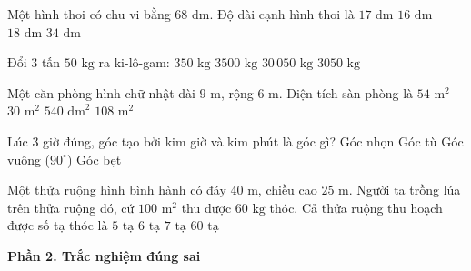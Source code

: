 \begin{ex} %
Một hình thoi có chu vi bằng $68\text{ dm}$. Độ dài cạnh hình thoi là
\choice
{\True $17\text{ dm}$}
{$16\text{ dm}$}
{$18\text{ dm}$}
{$34\text{ dm}$}
\end{ex}

\begin{ex} %
Đổi $3$ tấn $50\text{ kg}$ ra ki-lô-gam:
\choice
{$350\text{ kg}$}
{$3500\text{ kg}$}
{$30\,050\text{ kg}$}
{\True $3050\text{ kg}$}
\end{ex}

\begin{ex} %
Một căn phòng hình chữ nhật dài $9\text{ m}$, rộng $6\text{ m}$. Diện tích sàn phòng là
\choice
{\True $54\text{ m}^2$}
{$30\text{ m}^2$}
{$540\text{ dm}^2$}
{$108\text{ m}^2$}
\end{ex}

\begin{ex} %
Lúc 3 giờ đúng, góc tạo bởi kim giờ và kim phút là góc gì?
\choice
{Góc nhọn}
{Góc tù}
{\True Góc vuông ($90^\circ$)}
{Góc bẹt}
\end{ex}

\begin{ex} %
Một thửa ruộng hình bình hành có đáy $40\text{ m}$, chiều cao $25\text{ m}$. Người ta trồng lúa trên thửa ruộng đó, cứ $100\text{ m}^2$ thu được $60\text{ kg}$ thóc. Cả thửa ruộng thu hoạch được số tạ thóc là
\choice
{$5\text{ tạ}$}
{\True $6\text{ tạ}$}
{$7\text{ tạ}$}
{$60\text{ tạ}$}
\end{ex}

\textbf{Phần 2. Trắc nghiệm đúng sai}

